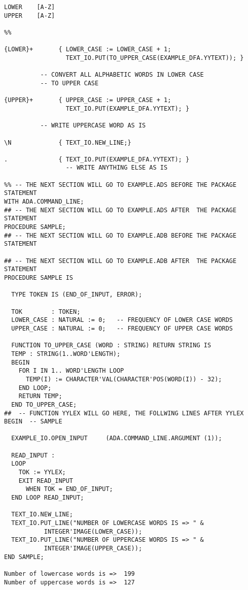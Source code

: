 \newpage
\small
\begin{verbatim}
LOWER    [A-Z]
UPPER    [A-Z]

%%

{LOWER}+       { LOWER_CASE := LOWER_CASE + 1; 
                 TEXT_IO.PUT(TO_UPPER_CASE(EXAMPLE_DFA.YYTEXT)); }

		  -- CONVERT ALL ALPHABETIC WORDS IN LOWER CASE
		  -- TO UPPER CASE

{UPPER}+       { UPPER_CASE := UPPER_CASE + 1;
                 TEXT_IO.PUT(EXAMPLE_DFA.YYTEXT); }

		  -- WRITE UPPERCASE WORD AS IS

\N             { TEXT_IO.NEW_LINE;}

.              { TEXT_IO.PUT(EXAMPLE_DFA.YYTEXT); }
                 -- WRITE ANYTHING ELSE AS IS

%% -- THE NEXT SECTION WILL GO TO EXAMPLE.ADS BEFORE THE PACKAGE STATEMENT
WITH ADA.COMMAND_LINE;
## -- THE NEXT SECTION WILL GO TO EXAMPLE.ADS AFTER  THE PACKAGE STATEMENT
PROCEDURE SAMPLE;
## -- THE NEXT SECTION WILL GO TO EXAMPLE.ADB BEFORE THE PACKAGE STATEMENT

## -- THE NEXT SECTION WILL GO TO EXAMPLE.ADB AFTER  THE PACKAGE STATEMENT
PROCEDURE SAMPLE IS

  TYPE TOKEN IS (END_OF_INPUT, ERROR);

  TOK        : TOKEN;
  LOWER_CASE : NATURAL := 0;   -- FREQUENCY OF LOWER CASE WORDS
  UPPER_CASE : NATURAL := 0;   -- FREQUENCY OF UPPER CASE WORDS

  FUNCTION TO_UPPER_CASE (WORD : STRING) RETURN STRING IS
  TEMP : STRING(1..WORD'LENGTH);
  BEGIN
    FOR I IN 1.. WORD'LENGTH LOOP
      TEMP(I) := CHARACTER'VAL(CHARACTER'POS(WORD(I)) - 32); 
    END LOOP;
    RETURN TEMP;
  END TO_UPPER_CASE;  
##  -- FUNCTION YYLEX WILL GO HERE, THE FOLLWING LINES AFTER YYLEX
BEGIN  -- SAMPLE

  EXAMPLE_IO.OPEN_INPUT     (ADA.COMMAND_LINE.ARGUMENT (1));

  READ_INPUT :
  LOOP
    TOK := YYLEX;
    EXIT READ_INPUT
      WHEN TOK = END_OF_INPUT;
  END LOOP READ_INPUT;

  TEXT_IO.NEW_LINE;
  TEXT_IO.PUT_LINE("NUMBER OF LOWERCASE WORDS IS => " & 
		   INTEGER'IMAGE(LOWER_CASE));
  TEXT_IO.PUT_LINE("NUMBER OF UPPERCASE WORDS IS => " & 
		   INTEGER'IMAGE(UPPER_CASE));
END SAMPLE;

Number of lowercase words is =>  199
Number of uppercase words is =>  127
\end{verbatim}
\normalsize


